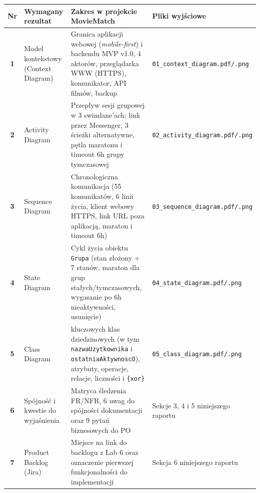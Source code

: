 \documentclass[10pt,a4paper]{article}
\begin{document}
\begin{table}[h!]
\centering
\small
\begin{tabularx}{\textwidth}{>{\bfseries}c >{\raggedright\arraybackslash}p{4.0cm} >{\raggedright\arraybackslash}X >{\raggedright\arraybackslash}p{4.7cm}}
\toprule
\rowcolor{Navy}
{\color{white}Nr} & {\color{white}\textbf{Wymagany rezultat}} & {\color{white}\textbf{Zakres w projekcie MovieMatch}} & {\color{white}\textbf{Pliki wyjściowe}} \\
\midrule
1 & Model kontekstowy (Context Diagram) & Granica aplikacji webowej (\textit{mobile-first}) i backendu MVP v1.0, 4 aktorów, przeglądarka WWW (HTTPS), komunikator, API filmów, backup & \texttt{01\_context\_diagram.pdf/.png} \\
\rowcolor{RowAlt}
2 & Activity Diagram & Przepływ sesji grupowej w 3 swimlane'ach: link przez Messenger, 3 ścieżki alternatywne, pętla maratonu i timeout 6h grupy tymczasowej & \texttt{02\_activity\_diagram.pdf/.png} \\
3 & Sequence Diagram & Chronologiczna komunikacja (55 komunikatów, 6 linii życia, klient webowy HTTPS, link URL poza aplikacją, maraton i timeout 6h) & \texttt{03\_sequence\_diagram.pdf/.png} \\
\rowcolor{RowAlt}
4 & State Diagram & Cykl życia obiektu \texttt{Grupa} (stan złożony + 7 stanów, maraton dla grup stałych/tymczasowych, wygasanie po 6h nieaktywności, usunięcie) & \texttt{04\_state\_diagram.pdf/.png} \\
5 & Class Diagram & 6 kluczowych klas dziedzinowych (w tym \texttt{nazwaUzytkownika} i \texttt{ostatniaAktywnoscO}), atrybuty, operacje, relacje, liczności i \texttt{\{xor\}} & \texttt{05\_class\_diagram.pdf/.png} \\
\rowcolor{RowAlt}
6 & Spójność i kwestie do wyjaśnienia & Matryca śledzenia FR/NFR, 6 uwag do spójności dokumentacji oraz 9 pytań biznesowych do PO & Sekcje 3, 4 i 5 niniejszego raportu \\
7 & Product Backlog (Jira) & Miejsce na link do backlogu z Lab 6 oraz oznaczenie pierwszej funkcjonalności do implementacji & Sekcja 6 niniejszego raportu \\
\bottomrule
\end{tabularx}
\end{table}
\end{document}
